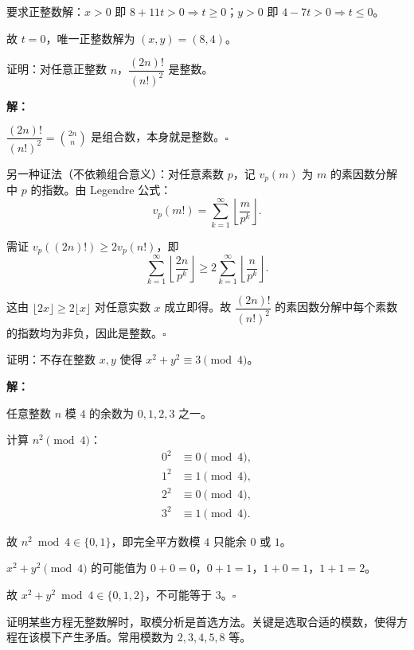 \documentclass[12pt, a4paper]{ctexart}
\begin{document}
要求正整数解：$x > 0$ 即 $8 + 11t > 0 \Rightarrow t \geqslant 0$；$y > 0$ 即 $4 - 7t > 0 \Rightarrow t \leqslant 0$。

故 $t = 0$，唯一正整数解为 $\boxed{(x, y) = (8, 4)}$。

\begin{examplebox}[【例题9】整除性证明综合]
证明：对任意正整数 $n$，$\dfrac{(2n)!}{(n!)^2}$ 是整数。
\end{examplebox}

\textbf{解：}

$\dfrac{(2n)!}{(n!)^2} = \binom{2n}{n}$ 是组合数，本身就是整数。\hfill $\square$

另一种证法（不依赖组合意义）：对任意素数 $p$，记 $v_p(m)$ 为 $m$ 的素因数分解中 $p$ 的指数。由 Legendre 公式：
\[ v_p(m!) = \sum_{k=1}^{\infty} \left\lfloor \frac{m}{p^k} \right\rfloor. \]

需证 $v_p((2n)!) \geqslant 2 v_p(n!)$，即
\[ \sum_{k=1}^{\infty} \left\lfloor \frac{2n}{p^k} \right\rfloor \geqslant 2 \sum_{k=1}^{\infty} \left\lfloor \frac{n}{p^k} \right\rfloor. \]

这由 $\lfloor 2x \rfloor \geqslant 2\lfloor x \rfloor$ 对任意实数 $x$ 成立即得。故 $\dfrac{(2n)!}{(n!)^2}$ 的素因数分解中每个素数的指数均为非负，因此是整数。\hfill $\square$

\begin{examplebox}[【例题10】模运算与完全平方数]
证明：不存在整数 $x, y$ 使得 $x^2 + y^2 \equiv 3 \pmod{4}$。
\end{examplebox}

\textbf{解：}

任意整数 $n$ 模 $4$ 的余数为 $0, 1, 2, 3$ 之一。

计算 $n^2 \pmod{4}$：
\begin{align*}
0^2 &\equiv 0 \pmod{4}, \\
1^2 &\equiv 1 \pmod{4}, \\
2^2 &\equiv 0 \pmod{4}, \\
3^2 &\equiv 1 \pmod{4}.
\end{align*}

故 $n^2 \bmod 4 \in \{0, 1\}$，即完全平方数模 $4$ 只能余 $0$ 或 $1$。

$x^2 + y^2 \pmod{4}$ 的可能值为 $0+0=0$，$0+1=1$，$1+0=1$，$1+1=2$。

故 $x^2 + y^2 \bmod 4 \in \{0, 1, 2\}$，不可能等于 $3$。\hfill $\square$

\begin{tipbox}[方法总结]
证明某些方程无整数解时，取模分析是首选方法。关键是选取合适的模数，使得方程在该模下产生矛盾。常用模数为 $2, 3, 4, 5, 8$ 等。
\end{tipbox}
\end{document}
